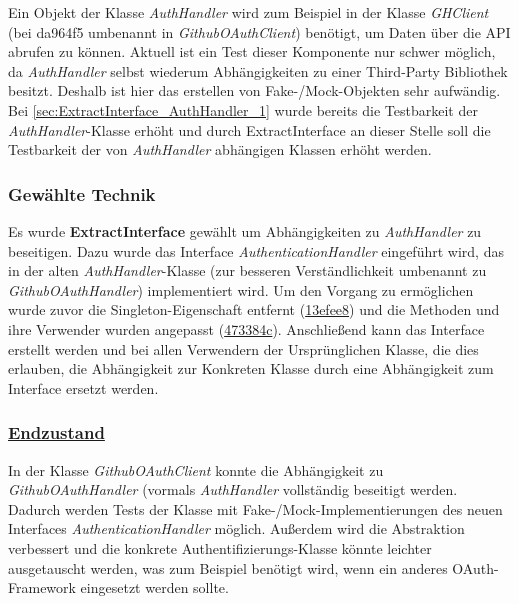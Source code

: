 Ein Objekt der Klasse \textit{AuthHandler} wird zum Beispiel in der Klasse \textit{GHClient} (bei da964f5 umbenannt in \textit{GithubOAuthClient}) benötigt, um Daten über die API abrufen zu können. Aktuell ist ein Test dieser Komponente nur schwer möglich, da \textit{AuthHandler} selbst wiederum Abhängigkeiten zu einer Third-Party Bibliothek besitzt. Deshalb ist hier das erstellen von Fake-/Mock-Objekten sehr aufwändig. Bei \ref{sec:ExtractInterface_AuthHandler_1} wurde bereits die Testbarkeit der \textit{AuthHandler}-Klasse erhöht und durch ExtractInterface an dieser Stelle soll die Testbarkeit der von \textit{AuthHandler} abhängigen Klassen erhöht werden.

\subsubsection*{Gewählte Technik}

Es wurde \textbf{ExtractInterface} gewählt um Abhängigkeiten zu \textit{AuthHandler} zu beseitigen. Dazu wurde das Interface \textit{AuthenticationHandler} eingeführt wird, das in der alten \textit{AuthHandler}-Klasse (zur besseren Verständlichkeit umbenannt zu \textit{GithubOAuthHandler}) implementiert wird. 
Um den Vorgang zu ermöglichen wurde zuvor die Singleton-Eigenschaft entfernt (\href{https://github.com/lukaspanni/OpenSourceStats/commit/13efee847af5b7627391d2ae6309b800727c51fd}{13efee8}) und die Methoden und ihre Verwender wurden angepasst (\href{https://github.com/lukaspanni/OpenSourceStats/commit/473384cdb4bc8e9f8269af865cf210923c42b5c5}{473384c}). 
Anschließend kann das Interface erstellt werden und bei allen Verwendern der Ursprünglichen Klasse, die dies erlauben, die Abhängigkeit zur Konkreten Klasse durch eine Abhängigkeit zum Interface ersetzt werden.

\subsubsection*{\href{https://github.com/lukaspanni/OpenSourceStats/tree/da964f5d7e2485f28cf19b4ec178b92805538adc/app/src/main/java/de/lukaspanni/opensourcestats/auth}{Endzustand}}

In der Klasse \textit{GithubOAuthClient} konnte die Abhängigkeit zu \textit{GithubOAuthHandler} (vormals \textit{AuthHandler} vollständig beseitigt werden.
 Dadurch werden Tests der Klasse mit Fake-/Mock-Implementierungen des neuen Interfaces \textit{AuthenticationHandler} möglich. 
Außerdem wird die Abstraktion verbessert und die konkrete Authentifizierungs-Klasse könnte leichter ausgetauscht werden, was zum Beispiel benötigt wird, wenn ein anderes OAuth-Framework eingesetzt werden sollte.

